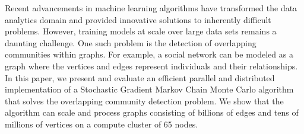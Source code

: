 
Recent advancements in machine learning algorithms have transformed the data
analytics domain and provided innovative solutions to inherently difficult
problems. However, training models at scale over large data sets remains a
daunting challenge. One such problem is the detection of overlapping
communities within graphs. For example, a social network can be modeled as a
graph where the vertices and edges represent individuals and their
relationships. In this paper, we present and evaluate an efficient parallel and
distributed implementation of a Stochastic Gradient Markov Chain Monte Carlo
algorithm that solves the overlapping community detection problem. We show that
the algorithm can scale and process graphs consisting of billions of edges and
tens of millions of vertices on a compute cluster of 65 nodes.

